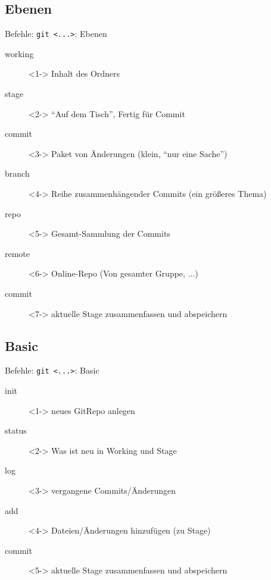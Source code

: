 \subsection{Ebenen}
\begin{frame}{Befehle: {\tt git <...>}: Ebenen}
	\begin{description}
		\item[working]<1->	Inhalt des Ordners
		\item[stage]<2->	``Auf dem Tisch'', Fertig für Commit
		\item[commit]<3->	Paket von Änderungen (klein, ``nur eine Sache'')
		\item[branch]<4->	Reihe zusammenhängender Commits (ein größeres Thema)
		\item[repo]<5->		Gesamt-Sammlung der Commits
		\item[remote]<6->	Online-Repo (Von gesamter Gruppe, ...)
		\item[commit]<7->	aktuelle Stage zusammenfassen und abspeichern
	\end{description}
\end{frame}

\subsection{Basic}
\begin{frame}{Befehle: {\tt git <...>}: Basic}
	\begin{description}
		\item[init]<1->		neues GitRepo anlegen
		\item[status]<2->	Was ist neu in Working und Stage
		\item[log]<3-> 		vergangene Commits/Änderungen
		\item[add]<4-> 		Dateien/Änderungen hinzufügen (zu Stage)
		\item[commit]<5->	aktuelle Stage zusammenfassen und abspeichern
	\end{description}
	\pic
\end{frame}

